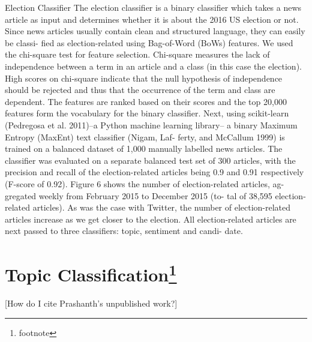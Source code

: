 Election Classifier
The election classifier is a binary classifier which takes a news article as input and determines whether it is about the 2016 US election or not. Since news articles usually contain clean and structured language, they can easily be classi- fied as election-related using Bag-of-Word (BoWs) features. We used the chi-square test for feature selection. Chi-square measures the lack of independence between a term in an article and a class (in this case the election). High scores on chi-square indicate that the null hypothesis of independence should be rejected and thus that the occurrence of the term and class are dependent. The features are ranked based on their scores and the top 20,000 features form the vocabulary for the binary classifier. Next, using scikit-learn (Pedregosa et al. 2011)–a Python machine learning library– a binary Maximum Entropy (MaxEnt) text classifier (Nigam, Laf- ferty, and McCallum 1999) is trained on a balanced dataset of 1,000 manually labelled news articles. The classifier was evaluated on a separate balanced test set of 300 articles, with the precision and recall of the election-related articles being 0.9 and 0.91 respectively (F-score of 0.92).
Figure 6 shows the number of election-related articles, ag- gregated weekly from February 2015 to December 2015 (to- tal of 38,595 election-related articles). As was the case with Twitter, the number of election-related articles increase as we get closer to the election. All election-related articles are next passed to three classifiers: topic, sentiment and candi- date.

\section[Topic Classification] {Topic Classification\footnote{footnote}}
[How do I cite Prashanth's unpublished work?]
 

